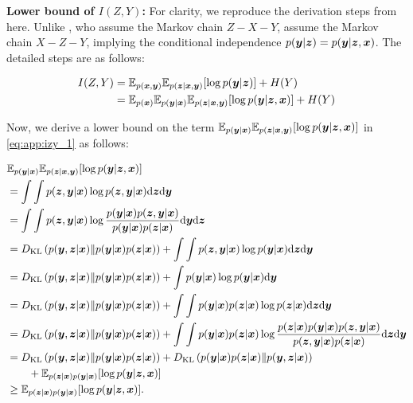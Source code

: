 \textbf{Lower bound of $I(Z, Y)$:} For clarity, we reproduce the derivation steps from \citet{wieczorek2020difference} here. Unlike \citet{alemi2017deep}, who assume the Markov chain $Z - X - Y$, \citet{wieczorek2020difference} assume the Markov chain $X - Z - Y$, implying the conditional independence $p(\bm{y} | \bm{z}) = p(\bm{y} | \bm{z}, \bm{x})$.
The detailed steps are as follows:

\begin{equation}
    \begin{aligned}
        I(Z,Y) & = \mathbb{E}_{p(\bm{x}, \bm{y})}\mathbb{E}_{p(\bm{z} | \bm{x} , \bm{y})} [\log p(\bm{y} | \bm{z})] + H(Y) \\
        & = \mathbb{E}_{p(\bm{x})} \mathbb{E}_{p(\bm{y} | \bm{x})} \mathbb{E}_{p(\bm{z} | \bm{x}, \bm{y})}[\log p (\bm{y} | \bm{z}, \bm{x})] + H(Y) \\
    \end{aligned}
    \label{eq:app:izy_1}
\end{equation}

Now, we derive a lower bound on the term $\mathbb{E}_{p(\bm{y} | \bm{x})} \mathbb{E}_{p(\bm{z} | \bm{x}, \bm{y})} [\log p (\bm{y} | \bm{z}, \bm{x})]$ in \cref{eq:app:izy_1} as follows:

\begin{equation}
    \begin{aligned}
        &\mathbb{E}_{p(\bm{y} | \bm{x})} \mathbb{E}_{p(\bm{z} | \bm{x}, \bm{y})} [\log p (\bm{y} | \bm{z}, \bm{x})] \\
        & = \int \int p(\bm{z}, \bm{y} | \bm{x}) \log p (\bm{z}, \bm{y} | \bm{x}) \mathrm{d} \bm{z} \mathrm{d} \bm{y} \\
        & = \int \int p(\bm{z}, \bm{y} | \bm{x}) \log \frac{p(\bm{y} | \bm{x}) p(\bm{z}, \bm{y} | \bm{x})}{p(\bm{y} | \bm{x}) p(\bm{z} | \bm{x})} \mathrm{d} \bm{y} \mathrm{d} \bm{z} \\
        &= D_{\text{KL}}\left(p(\bm{y}, \bm{z} | \bm{x}) \| p(\bm{y} | \bm{x}) p(\bm{z} | \bm{x}) \right) + \int \int p(\bm{z}, \bm{y} | \bm{x}) \log p(\bm{y} | \bm{x}) \mathrm{d} \bm{z} \mathrm{d} \bm{y} \\
        &= D_{\text{KL}}\left(p(\bm{y}, \bm{z} | \bm{x}) \| p(\bm{y} | \bm{x}) p(\bm{z} | \bm{x}) \right) + \int p(\bm{y} |\bm{x}) \log p(\bm{y} | \bm{x}) \mathrm{d} \bm{y} \\
        &= D_{\text{KL}}\left(p(\bm{y}, \bm{z} | \bm{x}) \| p(\bm{y} | \bm{x}) p(\bm{z} | \bm{x}) \right) + \int \int p(\bm{y} | \bm{x}) p (\bm{z} | \bm{x}) \log p(\bm{z} | \bm{x}) \mathrm{d} \bm{z} \mathrm{d} \bm{y} \\
        &= D_{\text{KL}}\left(p(\bm{y}, \bm{z} | \bm{x}) \| p(\bm{y} | \bm{x}) p(\bm{z} | \bm{x}) \right) + \int \int p(\bm{y} | \bm{x}) p(\bm{z} | \bm{x}) \log \frac{p(\bm{z} |\bm{x}) p(\bm{y} | \bm{x}) p(\bm{z}, \bm{y} | \bm{x})}{p(\bm{z}, \bm{y} | \bm{x}) p(\bm{z} | \bm{x})} \mathrm{d} \bm{z} \mathrm{d} \bm{y} \\
        &= D_{\text{KL}}\left(p(\bm{y}, \bm{z} | \bm{x}) \| p(\bm{y} | \bm{x}) p(\bm{z} | \bm{x}) \right) + D_{\text{KL}}\left(p(\bm{y}|\bm{x}) p(\bm{z} | \bm{x}) \| p(\bm{y}, \bm{z}|\bm{x}) \right) \\
        & \qquad + \mathbb{E}_{p(\bm{z} |\bm{x}) p(\bm{y} | \bm{x})} [\log p(\bm{y} | \bm{z}, \bm{x})] \\
        &\geq \mathbb{E}_{p(\bm{z} | \bm{x}) p(\bm{y} | \bm{x})} [\log p(\bm{y} | \bm{z}, \bm{x})]. 
    \end{aligned}
    \label{eq:app:izy_2}
\end{equation}

